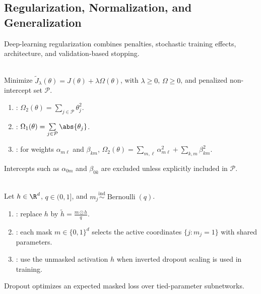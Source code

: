 \subsection{Regularization, Normalization, and Generalization}

Deep-learning regularization combines penalties, stochastic training effects, architecture, and validation-based stopping.

\begin{definition} \label{def:sl-neural-regularized-objective} \\
Minimize $\widetilde J_\lambda(\theta)=J(\theta)+\lambda\Omega(\theta)$, with $\lambda\geq0$, $\Omega\geq0$, and penalized non-intercept set $\mathcal P$.
\begin{enumerate}[label=(\roman*)]
\setlength{\itemsep}{0pt}
\item {}: $\Omega_2(\theta)=\sum\limits_{j\in\mathcal P}\theta_j^2$.
\item {}: $\Omega_1(\theta)=\sum\limits_{j\in\mathcal P}\abs{\theta_j}$.
\item {}: for weights $\alpha_{m\ell}$ and $\beta_{km}$, $\Omega_2(\theta)=\sum\limits_{m,\ell}\alpha_{m\ell}^2+\sum\limits_{k,m}\beta_{km}^2$.
\end{enumerate}
Intercepts such as $\alpha_{0m}$ and $\beta_{0k}$ are excluded unless explicitly included in $\mathcal P$.
\end{definition}

\begin{definition} \label{def:sl-dropout} \\
Let $h\in\R^d$, $q\in(0,1]$, and $m_j\overset{\mathrm{ind}}{\sim}\operatorname{Bernoulli}(q)$.
\begin{enumerate}[label=(\roman*)]
\setlength{\itemsep}{0pt}
\item {}: replace $h$ by $\widetilde h=\frac{m\odot h}{q}$.
\item {}: each mask $m\in\{0,1\}^d$ selects the active coordinates $\{j:m_j=1\}$ with shared parameters.
\item {}: use the unmasked activation $h$ when inverted dropout scaling is used in training.
\end{enumerate}
Dropout optimizes an expected masked loss over tied-parameter subnetworks.
\end{definition}

